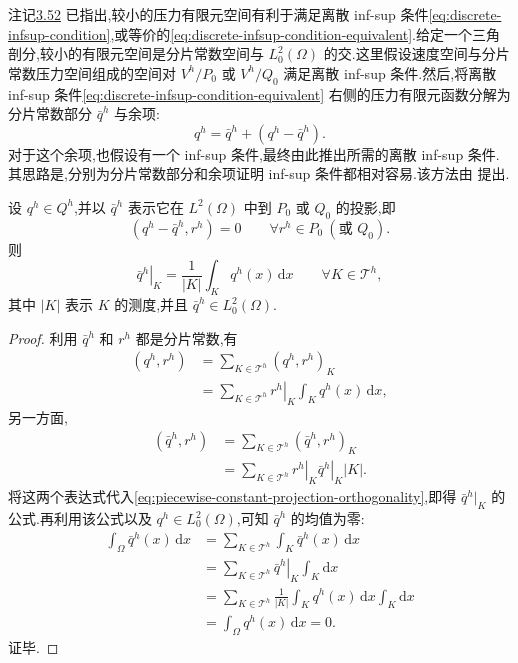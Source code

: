 \begin{note}[基本思路]\label{note:pressure-splitting-approach}
注记\hyperref[note:infsup-not-inherited]{3.52} 已指出,较小的压力有限元空间有利于满足离散 inf-sup 条件\cref{eq:discrete-infsup-condition},或等价的\cref{eq:discrete-infsup-condition-equivalent}.给定一个三角剖分,较小的有限元空间是分片常数空间与 $L_0^2(\Omega)$ 的交.这里假设速度空间与分片常数压力空间组成的空间对 $V^h/P_0$ 或 $V^h/Q_0$ 满足离散 inf-sup 条件.然后,将离散 inf-sup 条件\cref{eq:discrete-infsup-condition-equivalent} 右侧的压力有限元函数分解为分片常数部分 $\bar q^h$ 与余项:
\[
  q^h=\bar q^h+(q^h-\bar q^h).
\]
对于这个余项,也假设有一个 inf-sup 条件,最终由此推出所需的离散 inf-sup 条件.其思路是,分别为分片常数部分和余项证明 inf-sup 条件都相对容易.该方法由\textcite{BrezziBathe1990} 提出.
\end{note}

\begin{lemma}\label{lem:piecewise-constant-projection}
设 $q^h\in Q^h$,并以 $\bar q^h$ 表示它在 $L^2(\Omega)$ 中到 $P_0$ 或 $Q_0$ 的投影,即
\begin{equation}\label{eq:piecewise-constant-projection-orthogonality}
  (q^h-\bar q^h,r^h)=0
  \qquad\forall r^h\in P_0\ (\text{或 }Q_0).
\end{equation}
则
\[
  \left.\bar q^h\right|_K
  =\frac{1}{|K|}\int_K q^h(x)\,\mathrm{d}x
  \qquad\forall K\in\mathcal{T}^h,
\]
其中 $|K|$ 表示 $K$ 的测度,并且 $\bar q^h\in L_0^2(\Omega)$.
\end{lemma}

\begin{proof}
利用 $\bar q^h$ 和 $r^h$ 都是分片常数,有
\[
\begin{aligned}
  (q^h,r^h)
  &=\sum_{K\in\mathcal{T}^h}(q^h,r^h)_K\\
  &=\sum_{K\in\mathcal{T}^h}
      \left.r^h\right|_K\int_K q^h(x)\,\mathrm{d}x,
\end{aligned}
\]
另一方面,
\[
\begin{aligned}
  (\bar q^h,r^h)
  &=\sum_{K\in\mathcal{T}^h}(\bar q^h,r^h)_K\\
  &=\sum_{K\in\mathcal{T}^h}
      \left.r^h\right|_K\left.\bar q^h\right|_K|K|.
\end{aligned}
\]
将这两个表达式代入\cref{eq:piecewise-constant-projection-orthogonality},即得 $\bar q^h|_K$ 的公式.再利用该公式以及 $q^h\in L_0^2(\Omega)$,可知 $\bar q^h$ 的均值为零:
\[
\begin{aligned}
  \int_\Omega\bar q^h(x)\,\mathrm{d}x
  &=\sum_{K\in\mathcal{T}^h}\int_K\bar q^h(x)\,\mathrm{d}x\\
  &=\sum_{K\in\mathcal{T}^h}
      \left.\bar q^h\right|_K\int_K\mathrm{d}x\\
  &=\sum_{K\in\mathcal{T}^h}
      \frac{1}{|K|}\int_Kq^h(x)\,\mathrm{d}x\int_K\mathrm{d}x\\
  &=\int_\Omega q^h(x)\,\mathrm{d}x=0.
\end{aligned}
\]
证毕.
\end{proof}

